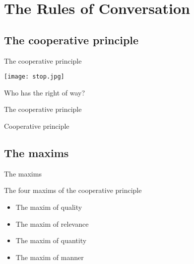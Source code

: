 \documentclass{beamer}
\subtitle[Conversation Rules]{The Rules of Conversation}
\makeatletter
\newcommand{\suboneone}{The cooperative principle}
\newcommand{\subonetwo}{The maxims}
\newcommand{\relevance}{
    \begin{tabular}{r @{: } l}
      Kim   & \uttr{How are you today?} \\
      Sandy & \uttr{Oh, Harrisburg is the capital of Pennsylvania.} \\
      Kim   & \uttr{Really? I thought the weather would be warmer.} \\
      Sandy & \begin{tabular}[t]{@{} l @{}}
                `Well, in my opinion, the soup could use a little \\
                more salt.'
              \end{tabular}
    \end{tabular}
  }
\makeatother
\begin{document}
  

  \section{The Rules of Conversation}
    \subsection{\suboneone}
      \begin{frame}{\suboneone}
        \begin{center}
          \texttt{[image: stop.jpg]}
        \end{center}
        \begin{block}{Who has the right of way?}
        \end{block}
      \end{frame}

      \begin{frame}{\suboneone}
        \begin{alertblock}{Cooperative principle \parencite{grice_logic_1989}}
          
        \end{alertblock}
      \end{frame}

    \subsection{\subonetwo}
      \begin{frame}{\subonetwo}
        \begin{block}{The four maxims of the cooperative principle}
          \begin{itemize}
            \item The maxim of quality
            \item The maxim of relevance
            \item The maxim of quantity
            \item The maxim of manner
          \end{itemize}
        \end{block}
      \end{frame}
\end{document}
